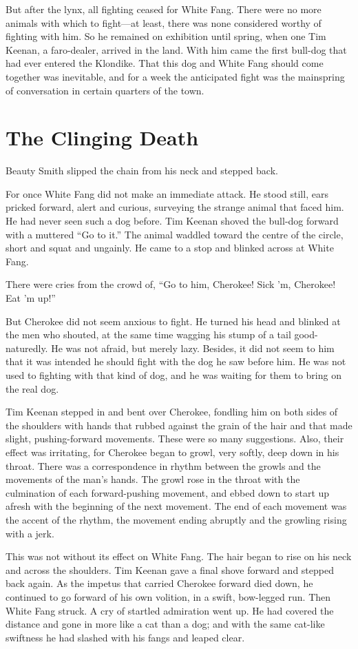 \documentclass[10pt]{book}
\begin{document}
But after the lynx, all fighting ceased for White Fang. There were no
more animals with which to fight—at least, there was none considered
worthy of fighting with him. So he remained on exhibition until spring,
when one Tim Keenan, a faro-dealer, arrived in the land. With him came
the first bull-dog that had ever entered the Klondike. That this dog
and White Fang should come together was inevitable, and for a week the
anticipated fight was the mainspring of conversation in certain
quarters of the town.
\chapter{The Clinging Death}

Beauty Smith slipped the chain from his neck and stepped back.

For once White Fang did not make an immediate attack. He stood still,
ears pricked forward, alert and curious, surveying the strange animal
that faced him. He had never seen such a dog before. Tim Keenan shoved
the bull-dog forward with a muttered “Go to it.” The animal waddled
toward the centre of the circle, short and squat and ungainly. He came
to a stop and blinked across at White Fang.

There were cries from the crowd of, “Go to him, Cherokee! Sick ’m,
Cherokee! Eat ’m up!”

But Cherokee did not seem anxious to fight. He turned his head and
blinked at the men who shouted, at the same time wagging his stump of a
tail good-naturedly. He was not afraid, but merely lazy. Besides, it
did not seem to him that it was intended he should fight with the dog
he saw before him. He was not used to fighting with that kind of dog,
and he was waiting for them to bring on the real dog.

Tim Keenan stepped in and bent over Cherokee, fondling him on both
sides of the shoulders with hands that rubbed against the grain of the
hair and that made slight, pushing-forward movements. These were so
many suggestions. Also, their effect was irritating, for Cherokee began
to growl, very softly, deep down in his throat. There was a
correspondence in rhythm between the growls and the movements of the
man’s hands. The growl rose in the throat with the culmination of each
forward-pushing movement, and ebbed down to start up afresh with the
beginning of the next movement. The end of each movement was the accent
of the rhythm, the movement ending abruptly and the growling rising
with a jerk.

This was not without its effect on White Fang. The hair began to rise
on his neck and across the shoulders. Tim Keenan gave a final shove
forward and stepped back again. As the impetus that carried Cherokee
forward died down, he continued to go forward of his own volition, in a
swift, bow-legged run. Then White Fang struck. A cry of startled
admiration went up. He had covered the distance and gone in more like a
cat than a dog; and with the same cat-like swiftness he had slashed
with his fangs and leaped clear.
\end{document}
